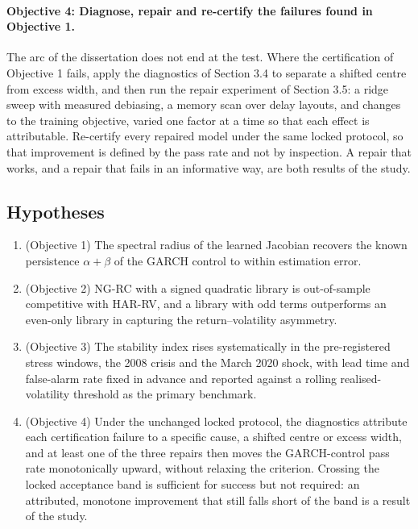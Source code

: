 \documentclass[12pt,a4paper]{article}
\begin{document}
\paragraph{Objective 4: Diagnose, repair and re-certify the failures
found in Objective 1.}
The arc of the dissertation does not end at the test. Where the
certification of Objective 1 fails, apply the diagnostics of Section 3.4
to separate a shifted centre from excess width, and then run the repair
experiment of Section 3.5: a ridge sweep with measured debiasing, a
memory scan over delay layouts, and changes to the training objective,
varied one factor at a time so that each effect is attributable.
Re-certify every repaired model under the same locked protocol, so that
improvement is defined by the pass rate and not by inspection. A repair
that works, and a repair that fails in an informative way, are both
results of the study.

\subsection{Hypotheses}

\begin{enumerate}\renewcommand{\labelenumi}{\textbf{H\arabic{enumi}.}}
\item (Objective 1) The spectral radius of the learned Jacobian recovers
the known persistence $\alpha + \beta$ of the GARCH control to within
estimation error.
\item (Objective 2) NG-RC with a signed quadratic library is
out-of-sample competitive with HAR-RV, and a library with odd terms
outperforms an even-only library in capturing the return--volatility
asymmetry.
\item (Objective 3) The stability index rises systematically in the
pre-registered stress windows, the 2008 crisis and the March 2020 shock,
with lead time and false-alarm rate fixed in advance and reported
against a rolling realised-volatility threshold as the primary
benchmark.
\item (Objective 4) Under the unchanged locked protocol, the diagnostics
attribute each certification failure to a specific cause, a shifted
centre or excess width, and at least one of the three repairs then moves
the GARCH-control pass rate monotonically upward, without relaxing the
criterion. Crossing the locked acceptance band is sufficient for success
but not required: an attributed, monotone improvement that still falls
short of the band is a result of the study.
\end{enumerate}
\end{document}

